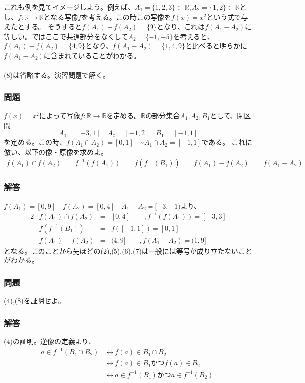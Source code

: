 \documentclass[a4j,dvipdfmx]{jsarticle}
\begin{document}
これも例を見てイメージしよう。例えば、$A_1=\{1,2,3\}\subset\mathbb{R},A_2=\{1,2\}\subset\mathbb{R}$とし、$f:\mathbb{R}\to\mathbb{R}$となる写像$f$を考える。この時この写像を$f(x)=x^2$という式で与えたとする。
そうすると$f(A_1)-f(A_2)=\{9\}$となり、これは$f(A_1-A_2)$に等しい。ではここで共通部分をなくして$A_2=\{-1,-5\}$を考えると、$f(A_1)-f(A_2)=\{4,9\}$となり、$f(A_1-A_2)=\{1,4,9\}$と比べると明らかに$f(A_1-A_2)$に含まれていることがわかる。\\
\hrulefill\\
(8)は省略する。演習問題で解く。\\
\hrulefill

\subsubsection*{問題}
$f(x)=x^2$によって写像$f:\mathbb{R}\to\mathbb{R}$を定める。$\mathbb{R}$の部分集合$A_1,A_2,B_1$として、閉区間
\begin{equation*}
    A_1=[-3,1]\quad A_2=[-1,2]\quad B_1=[-1,1] 
\end{equation*}
を定める。この時、$f(A_1\cap A_2)=[0,1]\quad\because A_1\cap A_2=[-1,1]$である。
これに倣い、以下の像・原像を求めよ。
\begin{align*}
    f(A_1)\cap f(A_2)\qquad f^{-1}(f(A_1))\qquad f(f^{-1}(B_1))\qquad f(A_1)-f(A_2)\qquad f(A_1-A_2)
\end{align*}
\vspace{3cm}
\subsubsection*{解答}
\color{red}
$f(A_1)=[0,9]\quad f(A_2)=[0,4]\quad A_1-A_2=[-3,-1)$より、
\begin{alignat*}{2}
    & f(A_1)\cap f(A_2) & = &[0,4]\qquad, f^{-1}(f(A_1))=[-3,3]\\
    & f(f^{-1}(B_1)) & = &f([-1,1])=[0,1]\\
    & f(A_1)-f(A_2) & = & (4,9]\qquad,f(A_1-A_2)=(1,9]
\end{alignat*}
となる。このことから先ほどの(2),(5),(6),(7)は一般には等号が成り立たないことがわかる。
\color{black}
\newpage
\subsubsection*{問題}
(4),(8)を証明せよ。
\vspace{10cm}
\subsubsection*{解答}
\color{red}
(4)の証明。逆像の定義より、
\begin{align*}
    a\in f^{-1}(B_1\cap B_2)
    &\leftrightarrow f(a)\in B_1\cap B_2\\
    &\leftrightarrow f(a)\in B_1かつf(a)\in B_2\\
    &\leftrightarrow a\in f^{-1}(B_1)かつ a\in f^{-1}(B_2)\square
\end{align*}
\end{document}

